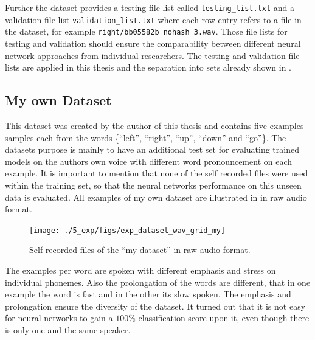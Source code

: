 Further the dataset provides a testing file list called \texttt{testing\_list.txt} and a validation file list \texttt{validation\_list.txt} where each row entry refers to a file in the dataset, for example \texttt{right/bb05582b\_nohash\_3.wav}.
Those file lists for testing and validation should ensure the comparability between different neural network approaches from individual researchers.
The testing and validation file lists are applied in this thesis and the separation into sets already shown in .



\subsection{My own Dataset}\label{sec:exp_dataset_my}
This dataset was created by the author of this thesis and contains five examples samples each from the words \{\enquote{left}, \enquote{right}, \enquote{up}, \enquote{down} and \enquote{go}\}.
The datasets purpose is mainly to have an additional test set for evaluating trained models on the authors own voice with different word pronouncement on each example.
It is important to mention that none of the self recorded files were used within the training set, so that the neural networks performance on this unseen data is evaluated.
All examples of my own dataset are illustrated in  in raw audio format.
\begin{figure}[!ht]
  \centering
    \texttt{[image: ./5\_exp/figs/exp\_dataset\_wav\_grid\_my]}
  \caption{Self recorded files of the \enquote{my dataset} in raw audio format.}
  \label{fig:exp_dataset_wav_grid_my}
\end{figure}
\FloatBarrier
\noindent
The examples per word are spoken with different emphasis and stress on individual phonemes.
Also the prolongation of the words are different, that in one example the word is fast and in the other its slow spoken.
The emphasis and prolongation ensure the diversity of the dataset. 
It turned out that it is not easy for neural networks to gain a $100\%$ classification score upon it, even though there is only one and the same speaker.




